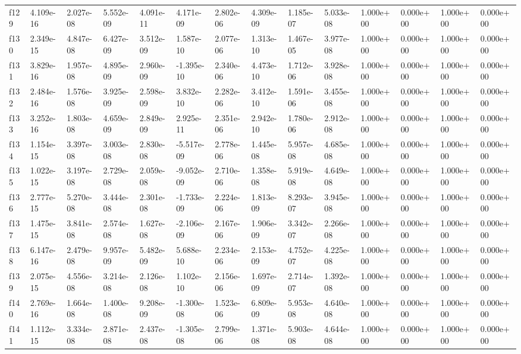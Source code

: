\begin{table}
\begin{tabular}{llllllllllllll}
f129 & 4.109e-16 & 2.027e-08 & 5.552e-09 & 4.091e-11 & 4.171e-09 & 2.802e-06 & 4.309e-09 & 1.185e-07 & 5.033e-08 & 1.000e+00 & 0.000e+00 & 1.000e+00 & 0.000e+00 \\
f130 & 2.349e-15 & 4.847e-08 & 6.427e-09 & 3.512e-09 & 1.587e-10 & 2.077e-06 & 1.313e-10 & 1.467e-05 & 3.977e-08 & 1.000e+00 & 0.000e+00 & 1.000e+00 & 0.000e+00 \\
f131 & 3.829e-16 & 1.957e-08 & 4.895e-09 & 2.960e-09 & -1.395e-10 & 2.340e-06 & 4.473e-10 & 1.712e-06 & 3.928e-08 & 1.000e+00 & 0.000e+00 & 1.000e+00 & 0.000e+00 \\
f132 & 2.484e-16 & 1.576e-08 & 3.925e-09 & 2.598e-09 & 3.832e-10 & 2.282e-06 & 3.412e-10 & 1.591e-06 & 3.455e-08 & 1.000e+00 & 0.000e+00 & 1.000e+00 & 0.000e+00 \\
f133 & 3.252e-16 & 1.803e-08 & 4.659e-09 & 2.849e-09 & 2.925e-11 & 2.351e-06 & 2.942e-10 & 1.780e-06 & 2.912e-08 & 1.000e+00 & 0.000e+00 & 1.000e+00 & 0.000e+00 \\
f134 & 1.154e-15 & 3.397e-08 & 3.003e-08 & 2.830e-08 & -5.517e-09 & 2.778e-06 & 1.445e-08 & 5.957e-08 & 4.685e-08 & 1.000e+00 & 0.000e+00 & 1.000e+00 & 0.000e+00 \\
f135 & 1.022e-15 & 3.197e-08 & 2.729e-08 & 2.059e-08 & -9.052e-09 & 2.710e-06 & 1.358e-08 & 5.919e-08 & 4.649e-08 & 1.000e+00 & 0.000e+00 & 1.000e+00 & 0.000e+00 \\
f136 & 2.777e-15 & 5.270e-08 & 3.444e-08 & 2.301e-08 & -1.733e-09 & 2.224e-06 & 1.813e-09 & 8.293e-07 & 3.945e-08 & 1.000e+00 & 0.000e+00 & 1.000e+00 & 0.000e+00 \\
f137 & 1.475e-15 & 3.841e-08 & 2.574e-08 & 1.627e-08 & -2.106e-09 & 2.167e-06 & 1.906e-09 & 3.342e-07 & 2.266e-08 & 1.000e+00 & 0.000e+00 & 1.000e+00 & 0.000e+00 \\
f138 & 6.147e-16 & 2.479e-08 & 9.957e-09 & 5.482e-09 & 5.688e-10 & 2.234e-06 & 2.153e-09 & 4.752e-07 & 4.225e-08 & 1.000e+00 & 0.000e+00 & 1.000e+00 & 0.000e+00 \\
f139 & 2.075e-15 & 4.556e-08 & 3.214e-08 & 2.126e-08 & 1.102e-10 & 2.156e-06 & 1.697e-09 & 2.714e-07 & 1.392e-08 & 1.000e+00 & 0.000e+00 & 1.000e+00 & 0.000e+00 \\
f140 & 2.769e-16 & 1.664e-08 & 1.400e-08 & 9.208e-09 & -1.300e-08 & 1.523e-06 & 6.809e-09 & 5.953e-08 & 4.640e-08 & 1.000e+00 & 0.000e+00 & 1.000e+00 & 0.000e+00 \\
f141 & 1.112e-15 & 3.334e-08 & 2.871e-08 & 2.437e-08 & -1.305e-08 & 2.799e-06 & 1.371e-08 & 5.903e-08 & 4.644e-08 & 1.000e+00 & 0.000e+00 & 1.000e+00 & 0.000e+00 \\

\end{tabular}
\end{table}
